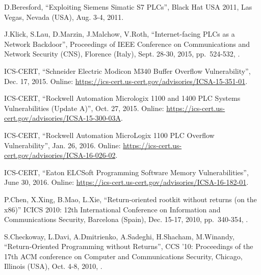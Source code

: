 \begin{thebibliography}{99}
D.Beresford,
``Exploiting Siemens Simatic S7 PLCs'',
Black Hat USA 2011,
Las Vegas, Nevada (USA), Aug. 3-4, 2011.

J.Klick, S.Lau, D.Marzin, J.Malchow, V.Roth,
``Internet-facing PLCs as a Network Backdoor'',
Proceedings of IEEE Conference on Communications and Network Security (CNS),
Florence (Italy), Sept. 28-30, 2015,
pp.\ 524-532,
.

ICS-CERT,
``Schneider Electric Modicon M340 Buffer Overflow Vulnerability'',
Dec. 17, 2015.
Online: \url{https://ics-cert.us-cert.gov/advisories/ICSA-15-351-01}.

ICS-CERT,
``Rockwell Automation Micrologix 1100 and 1400 PLC Systems Vulnerabilities (Update A)'',
Oct. 27, 2015.
Online: \url{https://ics-cert.us-cert.gov/advisories/ICSA-15-300-03A}.

ICS-CERT,
``Rockwell Automation MicroLogix 1100 PLC Overflow Vulnerability'',
Jan. 26, 2016.
Online: \url{https://ics-cert.us-cert.gov/advisories/ICSA-16-026-02}.

ICS-CERT,
``Eaton ELCSoft Programming Software Memory Vulnerabilities'',
June 30, 2016.
Online: \url{https://ics-cert.us-cert.gov/advisories/ICSA-16-182-01}.

P.Chen, X.Xing, B.Mao, L.Xie,
``Return-oriented rootkit without returns (on the x86)''
ICICS 2010: 12th International Conference on Information and Communications Security,
Barcelona (Spain), Dec. 15-17, 2010,
pp.\ 340-354,
.

S.Checkoway, L.Davi, A.Dmitrienko, A.Sadeghi, H.Shacham, M.Winandy,
``Return-Oriented Programming without Returns'',
CCS '10: Proceedings of the 17th ACM conference on Computer and Communications Security,
Chicago, Illinois (USA), Oct. 4-8, 2010,
.


\end{thebibliography}
